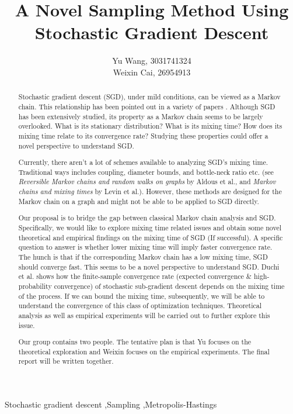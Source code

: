 \documentclass[preprint,12pt,3p]{elsarticle}
\begin{document}
\begin{frontmatter}

\title{A Novel Sampling Method Using Stochastic Gradient Descent}


\author{Yu Wang, 3031741324\\ Weixin Cai, 26954913}

\begin{abstract}
Stochastic gradient descent (SGD), under mild conditions, can be viewed as a Markov chain. This relationship has been pointed out in a variety of papers \cite{kushner2012stochastic, bach2014adaptivity}. Although SGD has been extensively studied, its property as a Markov chain seems to be largely overlooked. What is its stationary distribution? What is its mixing time? How does its mixing time relate to its convergence rate? Studying these properties could offer a novel perspective to understand SGD.

Currently, there aren't a lot of schemes available to analyzing SGD's mixing time. Traditional ways includes coupling, diameter bounds, and bottle-neck ratio etc. (see \emph{Reversible Markov chains and random walks on graphs} by Aldous et al.\cite{aldous2002reversible}, and \emph{Markov chains and mixing times} by Levin et al.\cite{levin2009markov}). However, these methods are designed for the Markov chain on a graph and might not be able to be applied to SGD directly.

Our proposal is to bridge the gap between classical Markov chain analysis and SGD. Specifically,  we would like to explore mixing time related issues and obtain some novel theoretical and empirical findings on the mixing time of SGD (If successful). A specific question to answer is whether lower mixing time will imply faster convergence rate. The hunch is that if the corresponding Markov chain has a low mixing time, SGD should converge fast. This seems to be a novel perspective to understand SGD. Duchi et al.\cite{duchi2012ergodic} shows how the finite-sample convergence rate (expected convergence \& high-probability convergence) of stochastic sub-gradient descent depends on the mixing time of the process. If we can bound the mixing time, subsequently, we will be able to understand the convergence of this class of optimization techniques. Theoretical analysis as well as empirical experiments will be carried out to further explore this issue.

Our group contains two people. The tentative plan is that Yu focuses on the theoretical exploration and Weixin focuses on the empirical experiments. The final report will be written together.
\end{abstract}

\begin{keyword}
Stochastic gradient descent \sep Sampling \sep Metropolis-Hastings
\end{keyword}

\end{frontmatter}
\end{document}
